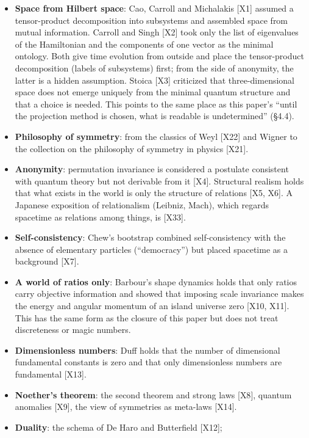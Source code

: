\documentclass[
  a4paper,
]{article}
\providecommand{\tightlist}{%
  \setlength{\itemsep}{0pt}\setlength{\parskip}{0pt}}
\begin{document}
\begin{itemize}
\tightlist
\item
  \textbf{Space from Hilbert space}: Cao, Carroll and Michalakis
  {[}X1{]} assumed a tensor-product decomposition into subsystems and
  assembled space from mutual information. Carroll and Singh {[}X2{]}
  took only the list of eigenvalues of the Hamiltonian and the
  components of one vector as the minimal ontology. Both give time
  evolution from outside and place the tensor-product decomposition
  (labels of subsystems) first; from the side of anonymity, the latter
  is a hidden assumption. Stoica {[}X3{]} criticized that
  three-dimensional space does not emerge uniquely from the minimal
  quantum structure and that a choice is needed. This points to the same
  place as this paper's ``until the projection method is chosen, what is
  readable is undetermined'' (§4.4).
\item
  \textbf{Philosophy of symmetry}: from the classics of Weyl {[}X22{]}
  and Wigner to the collection on the philosophy of symmetry in physics
  {[}X21{]}.
\item
  \textbf{Anonymity}: permutation invariance is considered a postulate
  consistent with quantum theory but not derivable from it {[}X4{]}.
  Structural realism holds that what exists in the world is only the
  structure of relations {[}X5, X6{]}. A Japanese exposition of
  relationalism (Leibniz, Mach), which regards spacetime as relations
  among things, is {[}X33{]}.
\item
  \textbf{Self-consistency}: Chew's bootstrap combined self-consistency
  with the absence of elementary particles (``democracy'') but placed
  spacetime as a background {[}X7{]}.
\item
  \textbf{A world of ratios only}: Barbour's shape dynamics holds that
  only ratios carry objective information and showed that imposing scale
  invariance makes the energy and angular momentum of an island universe
  zero {[}X10, X11{]}. This has the same form as the closure of this
  paper but does not treat discreteness or magic numbers.
\item
  \textbf{Dimensionless numbers}: Duff holds that the number of
  dimensional fundamental constants is zero and that only dimensionless
  numbers are fundamental {[}X13{]}.
\item
  \textbf{Noether's theorem}: the second theorem and strong laws
  {[}X8{]}, quantum anomalies {[}X9{]}, the view of symmetries as
  meta-laws {[}X14{]}.
\item
  \textbf{Duality}: the schema of De Haro and Butterfield {[}X12{]};

\end{itemize}
\end{document}
